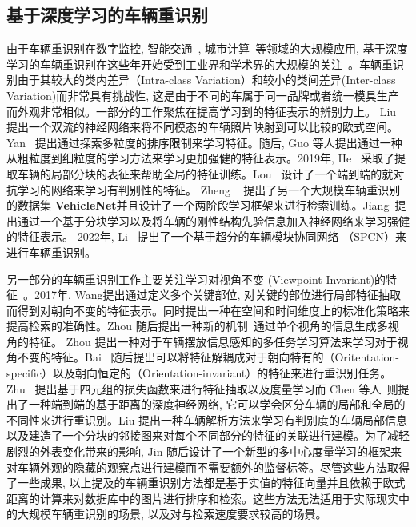\subsection{基于深度学习的车辆重识别}
由于车辆重识别在数字监控, 智能交通~\cite{zhang2011data}, 城市计算~\cite{zheng2014urban}等领域的大规模应用, 基于深度学习的车辆重识别\cite{liu2016large, liu2016deep, wang2017orientation,liu2017provid, bai2020disentangled, meng2020parsing}在这些年开始受到工业界和学术界的大规模的关注~。车辆重识别由于其较大的类内差异（Intra-class Variation）和较小的类间差异(Inter-class Variation)而非常具有挑战性, 这是由于不同的车属于同一品牌或者统一模具生产而外观非常相似。一部分的工作聚焦在提高学习到的特征表示的辨别力上。 Liu~\cite{liu2017beyond} 提出一个双流的神经网络来将不同模态的车辆照片映射到可以比较的欧式空间。Yan~\cite{yan2017exploiting} 提出通过探索多粒度的排序限制来学习特征。随后, Guo 等人提出通过一种从粗粒度到细粒度的学习方法来学习更加强健的特征表示。2019年, He~\cite{he2019part} 采取了提取车辆的局部分块的表征来帮助全局的特征训练。Lou ~\cite{lou2019embedding}设计了一个端到端的就对抗学习的网络来学习有判别性的特征。
Zheng ~\cite{zheng2020vehiclenet} 提出了另一个大规模车辆重识别的数据集 \textbf{VehicleNet}并且设计了一个两阶段学习框架来进行检索训练。Jiang~\cite{jiang2021robust}提出通过一个基于分块学习以及将车辆的刚性结构先验信息加入神经网络来学习强健的特征表示。 2022年, Li~\cite{li2022super} 提出了一个基于超分的车辆模块协同网络 （SPCN）来进行车辆重识别。 \par
另一部分的车辆重识别工作主要关注学习对视角不变 (Viewpoint Invariant)的特征~\cite{wang2017orientation, zhou2018aware, tang2019pamtri, bai2020disentangled}。2017年, Wang提出通过定义多个关键部位, 对关键的部位进行局部特征抽取而得到对朝向不变的特征表示。同时提出一种在空间和时间维度上的标准化策略来提高检索的准确性。Zhou 随后提出一种新的机制~\cite{zhou2018aware}通过单个视角的信息生成多视角的特征。 Zhou 提出一种对于车辆摆放信息感知的多任务学习算法来学习对于视角不变的特征。Bai ~\cite{bai2020disentangled}随后提出可以将特征解耦成对于朝向特有的（Oritentation-specific）以及朝向恒定的（Orientation-invariant）的特征来进行重识别任务。Zhu ~\cite{zhu2019vehicle}提出基于四元组的损失函数来进行特征抽取以及度量学习而 Chen 等人~\cite{chen2020vehicle}则提出了一种端到端的基于距离的深度神经网络, 它可以学会区分车辆的局部和全局的不同性来进行重识别。Liu 提出一种车辆解析方法来学习有判别度的车辆局部信息以及建造了一个分块的邻接图来对每个不同部分的特征的关联进行建模。为了减轻剧烈的外表变化带来的影响, Jin 随后设计了一个新型的多中心度量学习的框架来对车辆外观的隐藏的观察点进行建模而不需要额外的监督标签。尽管这些方法取得了一些成果, 以上提及的车辆重识别方法都是基于实值的特征向量并且依赖于欧式距离的计算来对数据库中的图片进行排序和检索。这些方法无法适用于实际现实中的大规模车辆重识别的场景, 以及对与检索速度要求较高的场景。

